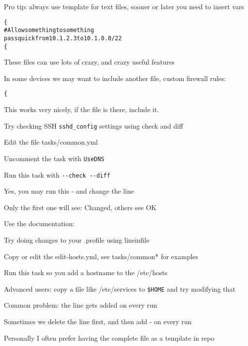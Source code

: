 \documentclass[18pt,landscape,a4paper,footrule]{foils}
\begin{document}
Pro tip: always use template for text files, sooner or later you need to insert vars

\begin{alltt}\scriptsize
\{% if inventory_hostname_short == "fw-01" or inventory_hostname_short == "fw-02" %\}
# Allow something to something
pass quick from 10.1.2.3 to 10.1.0.0/22
\{% endif %\}
\end{alltt}
These files can use lots of crazy, and crazy useful features


In some devices we may want to include another file, custom firewall rules:
\begin{alltt}\footnotesize
\{% include "custom-pf/" + inventory_hostname ignore missing %\}
\end{alltt}

This works very nicely, if the file is there, include it.


Try checking SSH \verb+sshd_config+ settings using check and diff

\begin{list2}
\item Edit the file tasks/common.yml
\item Uncomment the task with \verb+UseDNS+
\item Run this task with \verb+--check --diff+
\item Yes, you may run this - and change the line
\item Only the first one will see: Changed, others see OK
\end{list2}

Use the documentation:\\





Try doing changes to your .profile using lineinfile

\begin{list2}
\item Copy or edit the edit-hosts.yml, see tasks/common* for examples
\item Run this task so you add a hostname to the /etc/hosts
\item Advanced users: copy a file like /etc/services to \verb+$HOME+ and try modifying that
\item Common problem: the line gets added on every run
\item Sometimes we delete the line first, and then add - on every run
\item Personally I often prefer having the complete file as a template in repo\\
\end{list2}
\end{document}
